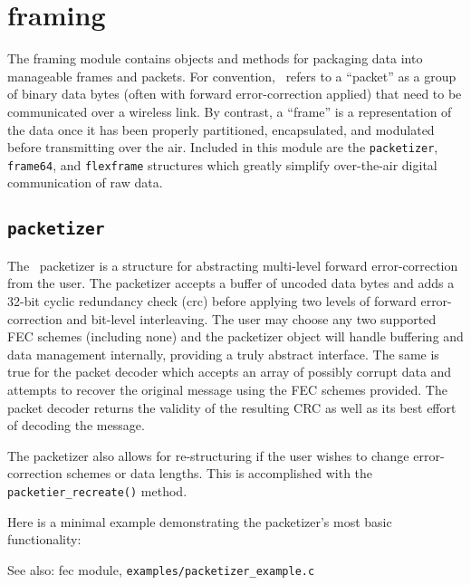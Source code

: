 % 
%

\section{framing}
\label{module:framing}
The framing module contains objects and methods for packaging data into
manageable frames and packets.
For convention, \liquid\ refers to a ``packet'' as a group of binary
data bytes (often with forward error-correction applied)
that need to be communicated over a wireless link.
By contrast, a ``frame'' is a representation of the data once it has been
properly partitioned, encapsulated, and modulated before transmitting over the
air.
Included in this module are the {\tt packetizer}, 
{\tt frame64}, and {\tt flexframe} structures which
greatly simplify over-the-air digital communication of raw data.

\subsection{{\tt packetizer}}
\label{module:framing:packetizer}
The \liquid\ packetizer is a structure for abstracting multi-level forward
error-correction from the user.
The packetizer accepts a buffer of uncoded data bytes and adds a 32-bit
cyclic redundancy check (crc) before applying two levels of forward
error-correction and bit-level interleaving.
The user may choose any two supported FEC schemes (including none) and the
packetizer object will handle buffering and data management internally,
providing a truly abstract interface.
The same is true for the packet decoder which accepts an array
of possibly corrupt data and attempts to recover the original message using
the FEC schemes provided.
The packet decoder returns the validity of the resulting CRC as well as its
best effort of decoding the message.

The packetizer also allows for re-structuring if the user wishes to change
error-correction schemes or data lengths.  This is accomplished with the
{\tt packetier\_recreate()} method.

Here is a minimal example demonstrating the packetizer's most basic
functionality:


See also: fec module, {\tt examples/packetizer\_example.c}

